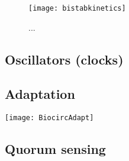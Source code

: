 \begin{figure}
	\begin{center}
		\texttt{[image: bistabkinetics]}
	\end{center}
	\caption{ ... }
	\label{fig:bistabkin}
\end{figure}

\subsection{Oscillators (clocks)}
\subsection{Adaptation}

\begin{marginfigure}
	\begin{center}
		\texttt{[image: BiocircAdapt]}
	\end{center}
	\caption{ ... }
	\label{fig:bcadapt}
\end{marginfigure}

\subsection{Quorum sensing}